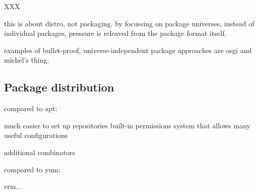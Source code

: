 \documentclass{article}
\begin{document}
XXX

this is about distro, not packaging.  by focussing on package universes,
instead of individual packages, pressure is releaved from the package
format itself.

examples of bullet-proof, universe-independent package approaches are
osgi and michel's thing.


\subsection{Package distribution}

compared to apt:

  much easier to set up repositories
 built-in permissions system that allows many useful configurations

 additional combinators 

compared to yum:

erm...




\end{document}
